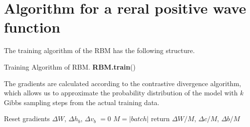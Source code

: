 \documentclass[a4paper]{article}
\begin{document}
\section{Algorithm for a reral positive wave function}
The training algorithm of the RBM has the following structure.
 
\begin{algorithm}[H]
	 \caption{Training Algorithm of RBM. \textbf{RBM.train}() }
  \SetAlgoLined
 
\end{algorithm}


The gradients are calculated according to the contrastive divergence algorithm, which allows us to approximate the probability distribution of the model with $k$ Gibbs sampling steps from the actual training data.

\begin{algorithm}[H]
	 \caption{Compute Gradient from Batch. \textbf{\lstinline{RBM.compute_batch_gradients}}(k, batch) }
  \SetAlgoLined
  Reset gradients $\Delta W$, $\Delta h_b$, $\Delta v_b$ $= 0$\;
 $M = \vert batch \vert$ \;
 return $\Delta W / M$,  $\Delta c / M$, $\Delta b / M$
\end{algorithm}
\end{document}
